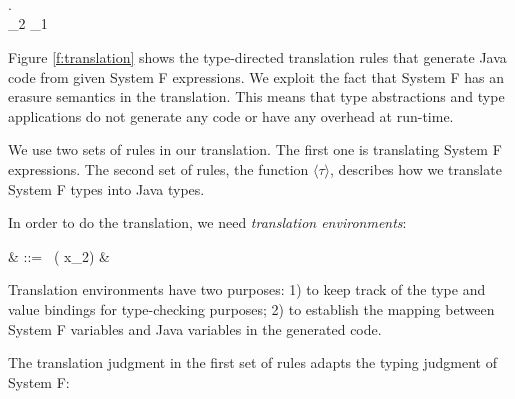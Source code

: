 { 

 \\ \\


 \ea

 \eda



\vspace{-5pt}
\begin{hscode}\SaveRestoreHook
{}%
%
%
%
\>[3]{}\langle\alpha\rangle{}\<[21]%
\>[21]{}\mathrel{=}\<[E]%
\\
\>[3]{}\langle\forall \alpha. \tau\rangle{}\<[21]%
\>[21]{}\mathrel{=}\langle\tau\rangle{}\<[E]%
\\
\>[3]{}\langle\tau_2 \rightarrow \tau_1\rangle{}\<[21]%
\>[21]{}\mathrel{=}\<[E]%
\ColumnHook
\end{hscode}\resethooks
\vspace{-10pt}

 }


Figure \ref{f:translation} shows the type-directed translation rules
that generate Java code from given System F expressions. We exploit
the fact that System F has an erasure semantics in the
translation. This means that type abstractions and type applications
do not generate any code or have any overhead at run-time.

We use two sets of rules in our translation. The first one
is translating System F expressions. The second set of rules,
 the function $\langle \tau\rangle$, describes 
 how we translate System F types into Java types.

In order to do the translation, we need \emph{translation environments}:

\hspace{-10pt} & \Gamma ::=
\epsilon \mid \Gamma~( \mapsto x_2) \mid \Gamma \alpha & \\ \eda

\noindent Translation environments have two purposes: 1) to keep track of the type
and value bindings for type-checking purposes; 2) to establish the mapping
between System F variables and Java variables in the generated code.

The translation judgment in the first set of rules adapts the typing
judgment of System F:

